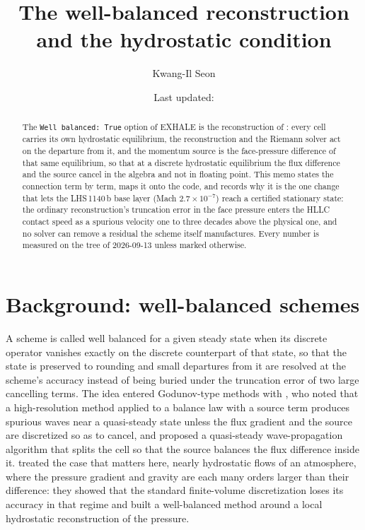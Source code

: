 \documentclass[english,a4paper]{my_memo}
\title{The well-balanced reconstruction and the hydrostatic condition}
\author{Kwang-Il Seon}
\date{Last updated: \docmoddate}
\begin{document}
\maketitle

\begin{abstract}
The \texttt{Well balanced:\ True} option of EXHALE is the reconstruction of
\citet{Kappeli2016}: every cell carries its own hydrostatic equilibrium, the
reconstruction and the Riemann solver act on the departure from it, and the
momentum source is the face-pressure difference of that same equilibrium, so
that at a discrete hydrostatic equilibrium the flux difference and the source
cancel in the algebra and not in floating point. This memo states the
connection term by term, maps it onto the code, and records why it is the one
change that lets the LHS\,1140\,b base layer (Mach $2.7\times10^{-7}$) reach a
certified stationary state: the ordinary reconstruction's truncation error in
the face pressure enters the HLLC contact speed as a spurious velocity one to
three decades above the physical one, and no solver can remove a residual the
scheme itself manufactures. Every number is measured on the tree of
2026-09-13 unless marked otherwise.
\end{abstract}

\section{Background: well-balanced schemes}

A scheme is called well balanced for a given steady state when its discrete
operator vanishes exactly on the discrete counterpart of that state, so that
the state is preserved to rounding and small departures from it are resolved
at the scheme's accuracy instead of being buried under the truncation error
of two large cancelling terms. The idea entered Godunov-type methods with
\citet{LeVeque1998}, who noted that a high-resolution method applied to a
balance law with a source term produces spurious waves near a quasi-steady
state unless the flux gradient and the source are discretized so as to cancel,
and proposed a quasi-steady wave-propagation algorithm that splits the cell
so that the source balances the flux difference inside it.
\citet{Botta2004} treated the case that matters here, nearly hydrostatic
flows of an atmosphere, where the pressure gradient and gravity are each many
orders larger than their difference: they showed that the standard
finite-volume discretization loses its accuracy in that regime and built a
well-balanced method around a local hydrostatic reconstruction of the pressure.
\end{document}
